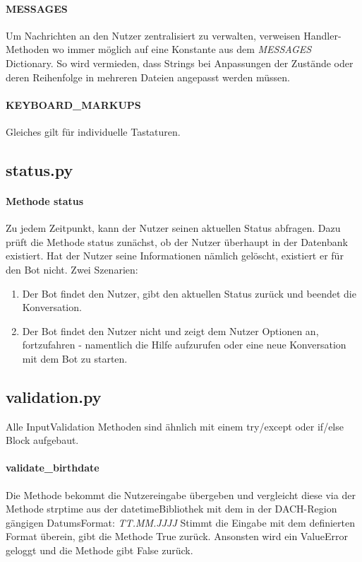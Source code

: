             \paragraph{MESSAGES}
                Um Nachrichten an den Nutzer zentralisiert zu verwalten, verweisen Handler-Methoden wo immer möglich auf eine Konstante aus dem \emph{MESSAGES} Dictionary. So wird vermieden, dass Strings bei Anpassungen der Zustände oder deren Reihenfolge in mehreren Dateien angepasst werden müssen.
            
            \paragraph{KEYBOARD\_MARKUPS}
                Gleiches gilt für individuelle Tastaturen. 
                

        \subsection{status.py}
            \paragraph{Methode status}
                Zu jedem Zeitpunkt, kann der Nutzer seinen aktuellen Status abfragen. Dazu prüft die Methode status zunächst, ob der Nutzer überhaupt in der Datenbank existiert. Hat der Nutzer seine Informationen nämlich gelöscht, existiert er für den Bot nicht. Zwei Szenarien: 
                \begin{enumerate}
                    \item Der Bot findet den Nutzer, gibt den aktuellen Status zurück und beendet die Konversation.
                    \item Der Bot findet den Nutzer nicht und zeigt dem Nutzer Optionen an, fortzufahren - namentlich die Hilfe aufzurufen oder eine neue Konversation mit dem Bot zu starten.
                \end{enumerate}
        

        \subsection{validation.py}
            Alle Input\-Validation Methoden sind ähnlich mit einem try/except oder if/else Block aufgebaut.

            \paragraph{validate\_birthdate}
                Die Methode bekommt die Nutzereingabe übergeben und vergleicht diese via der Methode strptime aus der datetime\-Bibliothek \cite{datetime} mit dem in der DACH-Region gängigen Datums\-Format: \emph{TT.MM.JJJJ}
                Stimmt die Eingabe mit dem definierten Format überein, gibt die Methode True zurück. Ansonsten wird ein ValueError geloggt und die Methode gibt False zurück.

